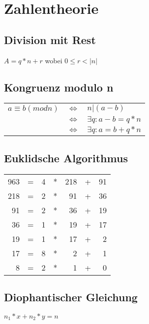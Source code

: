 \section{Zahlentheorie}

\subsection{Division mit Rest}
$ A = q * n + r$ wobei $ 0 \leq r < |n|$

\subsection{Kongruenz modulo n}
\begin{tabular}{lll}
    $ a \equiv b (mod n)$ & $\iff$ & $n|(a - b)$ \\
    & $\iff$ & $\exists q : a-b = q * n$ \\
    & $\iff$ & $\exists q : a = b + q * n$ \\
\end{tabular}

\subsection{Euklidsche Algorithmus}
\begin{tabular}{rcrcrcr}
    963 & = & 4 & * & 218 & + & 91 \\
    218 & = & 2 & * & 91 & + & 36 \\
    91 & = & 2 & * & 36 & + & 19 \\
    36 & = & 1 & * & 19 & + & 17 \\
    19 & = & 1 & * & 17 & + & 2 \\
    17 & = & 8 & * & 2 & + & 1 \\
    8 & = & 2 & * & 1 & + & 0 \\
\end{tabular}

\subsection{Diophantischer Gleichung}
$n_1 * x + n_2 * y = n$
